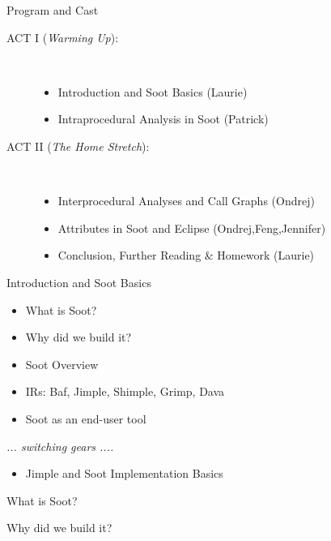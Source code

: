 \begin{slide}{Program and Cast}
\begin{description}
\item[ACT I ({\em Warming Up}):] \hspace{1in} \\
\begin{itemize}
\item Introduction and Soot Basics {\blue (Laurie)}
\item Intraprocedural Analysis in Soot {\blue (Patrick)}
\end{itemize}
\item[ACT II ({\em The Home Stretch}):] \hspace{1in} \\
\begin{itemize}
\item Interprocedural Analyses and Call Graphs {\blue (Ondrej)}
\item Attributes in Soot and Eclipse {\blue (Ondrej,Feng,Jennifer)}
\item Conclusion, Further Reading \& Homework {\blue (Laurie)}
\end{itemize}
\end{description}
\end{slide}

\begin{slide}{Introduction and Soot Basics}
\begin{itemize}
\item What is Soot?
\item Why did we build it?
\item Soot Overview
\item IRs: Baf, {\red Jimple}, Shimple, Grimp, Dava
\item Soot as an end-user tool 
\end{itemize}
\begin{center}
{\em ... switching gears .... }
\end{center}
\begin{itemize}
\item Jimple and Soot Implementation Basics 
\end{itemize}
\end{slide}

\begin{slide}{What is Soot?}
\end{slide}

\begin{slide}{Why did we build it?}
\end{slide}

